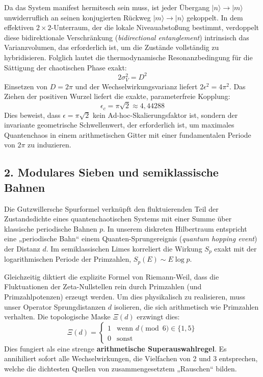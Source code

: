 \documentclass[aps,prl,preprint,superscriptaddress,floatfix]{revtex4-2}
\begin{document}
Da das System manifest hermitesch sein muss, ist jeder Übergang $|n\rangle \to |m\rangle$ unwiderruflich an seinen konjugierten Rückweg $|m\rangle \to |n\rangle$ gekoppelt. In dem effektiven $2 \times 2$-Unterraum, der die lokale Niveauabstoßung bestimmt, verdoppelt diese bidirektionale Verschränkung (\textit{bidirectional entanglement}) intrinsisch das Varianzvolumen, das erforderlich ist, um die Zustände vollständig zu hybridisieren. Folglich lautet die thermodynamische Resonanzbedingung für die Sättigung der chaotischen Phase exakt:
\begin{equation}
2 \sigma_V^2 = D^2
\end{equation}
Einsetzen von $D = 2\pi$ und der Wechselwirkungsvarianz liefert $2 \epsilon^2 = 4\pi^2$. Das Ziehen der positiven Wurzel liefert die exakte, parameterfreie Kopplung:
\begin{equation}
\epsilon_c = \pi\sqrt{2} \approx 4,44288
\end{equation}
Dies beweist, dass $\epsilon = \pi\sqrt{2}$ kein Ad-hoc-Skalierungsfaktor ist, sondern der invariante geometrische Schwellenwert, der erforderlich ist, um maximales Quantenchaos in einem arithmetischen Gitter mit einer fundamentalen Periode von $2\pi$ zu induzieren.

\subsection{2. Modulares Sieben und semiklassische Bahnen}
Die Gutzwillersche Spurformel verknüpft den fluktuierenden Teil der Zustandsdichte eines quantenchaotischen Systems mit einer Summe über klassische periodische Bahnen $p$. In unserem diskreten Hilbertraum entspricht eine „periodische Bahn“ einem Quanten-Sprungereignis (\textit{quantum hopping event}) der Distanz $d$. Im semiklassischen Limes korreliert die Wirkung $S_p$ exakt mit der logarithmischen Periode der Primzahlen, $S_p(E) \sim E \log p$.

Gleichzeitig diktiert die explizite Formel von Riemann-Weil, dass die Fluktuationen der Zeta-Nullstellen rein durch Primzahlen (und Primzahlpotenzen) erzeugt werden. Um dies physikalisch zu realisieren, muss unser Operator Sprungdistanzen $d$ isolieren, die sich arithmetisch wie Primzahlen verhalten. Die topologische Maske $\Xi(d)$ erzwingt dies:
\begin{equation}
\Xi(d) = \begin{cases} 1 & \text{wenn } d \pmod 6 \in \{1, 5\} \\ 0 & \text{sonst} \end{cases}
\end{equation}
Dies fungiert als eine strenge \textbf{arithmetische Superauswahlregel}. Es annihiliert sofort alle Wechselwirkungen, die Vielfachen von 2 und 3 entsprechen, welche die dichtesten Quellen von zusammengesetztem „Rauschen“ bilden. 
\end{document}
